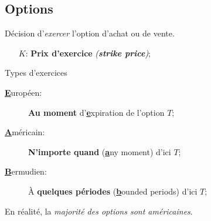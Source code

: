 \documentclass[10pt, french]{article}
\begin{document}
\begin{multicols*}{2}
\subsection{Options}

\begin{definitionNOHFILL}
Décision d'\textit{exercer} l'option d'achat ou de vente.

\begin{distributions}[Notation]
\begin{itemize}[leftmargin = *]
	\item[$K$:]	\textbf{Prix d'exercice} \textit{(\textbf{strike price})};
\end{itemize}
\end{distributions}

\begin{conceptgen}{Types d'exercices}
\begin{description}
	\item[\textbf{\underline{E}}uropéen:]		\textbf{Au moment} d'\textbf{\underline{e}}xpiration de l'option $T$;
	\item[\textbf{\underline{A}}méricain:]	\textbf{N'importe quand} (\textbf{\underline{a}}ny moment) d'ici $T$;
	\item[\textbf{\underline{B}}ermudien:]	À \textbf{quelques périodes} (\textbf{\underline{b}}ounded periods) d'ici $T$;
\end{description}
En réalité, la \textit{majorité des options sont américaines}.
\end{conceptgen}
\end{definitionNOHFILL}

\begin{definitionNOHFILL}
\begin{minipage}{0.6\columnwidth}
\end{minipage}
\end{definitionNOHFILL}
\end{multicols*}
\end{document}
